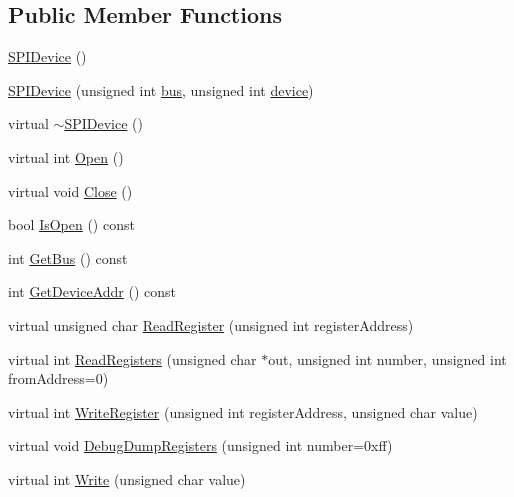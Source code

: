 \subsection*{Public Member Functions}
\begin{DoxyCompactItemize}
\item 
\hyperlink{classcubesat_1_1SPIDevice_a1ba36c44e2fcb940bb7657ae21769476}{S\+P\+I\+Device} ()
\item 
\hyperlink{classcubesat_1_1SPIDevice_a5079ac1013f2e25e3eb873ba06ed41b1}{S\+P\+I\+Device} (unsigned int \hyperlink{classcubesat_1_1SPIDevice_a4b4e91bed3762e7c7e4399fba3cb386d}{bus}, unsigned int \hyperlink{classcubesat_1_1SPIDevice_aa771ccb034a870a9188e63600fd4b40a}{device})
\item 
virtual \hyperlink{classcubesat_1_1SPIDevice_a4026a0ad0b2f3a70b663a7f29b7e29a4}{$\sim$\+S\+P\+I\+Device} ()
\item 
virtual int \hyperlink{classcubesat_1_1SPIDevice_a2467a2271529579bdeaf0ffb6078b253}{Open} ()
\item 
virtual void \hyperlink{classcubesat_1_1SPIDevice_a70a01bc99d4282619ade9c1a50e4dfe5}{Close} ()
\item 
bool \hyperlink{classcubesat_1_1SPIDevice_ae8ec7dd3378f239ab3c8001d68b04f4c}{Is\+Open} () const
\item 
int \hyperlink{classcubesat_1_1SPIDevice_adfb4c589f0417f457e0fd1e4d6cf8364}{Get\+Bus} () const
\item 
int \hyperlink{classcubesat_1_1SPIDevice_af2cac3b367a75f2980f61d6134688a63}{Get\+Device\+Addr} () const
\item 
virtual unsigned char \hyperlink{classcubesat_1_1SPIDevice_ae2630483e262c19ed60c2c6152804e19}{Read\+Register} (unsigned int register\+Address)
\item 
virtual int \hyperlink{classcubesat_1_1SPIDevice_a6626b40abed0d54522424339b47bbe97}{Read\+Registers} (unsigned char $\ast$out, unsigned int number, unsigned int from\+Address=0)
\item 
virtual int \hyperlink{classcubesat_1_1SPIDevice_a97694ab1aef2ec463dcd24001eb513eb}{Write\+Register} (unsigned int register\+Address, unsigned char value)
\item 
virtual void \hyperlink{classcubesat_1_1SPIDevice_a5ae07bf0c830f2c05fc701bbb6a9ad1d}{Debug\+Dump\+Registers} (unsigned int number=0xff)
\item 
virtual int \hyperlink{classcubesat_1_1SPIDevice_a0d2ded1a6813fcb79e1f69bde2db0eb6}{Write} (unsigned char value)
\item 

\end{DoxyCompactItemize}
